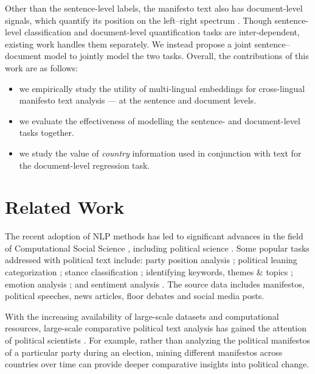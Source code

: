 \documentclass[11pt,a4paper]{article}
\begin{document}

Other than the sentence-level labels, the manifesto text also has document-level signals,
which quantify its position on the left--right spectrum \cite{slapin2008scaling}. Though sentence-level classification and document-level quantification tasks are inter-dependent, existing work handles them separately.  We instead propose a joint sentence--document model to jointly model the two tasks. Overall, the contributions of this work are as follows:
\begin{itemize}
\item we empirically study the utility of multi-lingual embeddings for cross-lingual manifesto text analysis --- at the sentence and document levels.

\item we evaluate the effectiveness of modelling the sentence- and document-level tasks together.

\item we study the value of \textit{country} information used in conjunction with text for the document-level regression task.
\end{itemize}


\section{Related Work}

The recent adoption of NLP methods has led to significant advances in the field of Computational Social Science \cite{lazer2009life}, including political science \cite{grimmer2013text}. Some popular tasks addressed with political text include: party position analysis \cite{biessmann2016automating};  political leaning categorization \cite{akoglu2014quantifying, zhou2011classifying}; stance classification \cite{sridhar2014collective}; identifying keywords, themes \& topics \cite{karan2016analysis, nallapati2004extraction, ding2011keyphrase}; emotion analysis \cite{rheault2016expressions}; and sentiment analysis \cite{bakliwal2013sentiment}. The source data includes manifestos, political speeches, news articles, floor debates and social media posts. 

With the increasing availability of large-scale datasets and computational resources, large-scale comparative political text analysis has gained the attention of political scientists \cite{lucas2015computer}. For example, rather than analyzing the political manifestos of a particular party during an election, mining different manifestos across countries over time can provide deeper comparative insights into political change.
\end{document}
